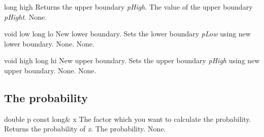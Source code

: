 \setConstInstance
\printEmptyMethodReturnSpecial
{long}
{high}
{Returns the upper boundary {\em pHigh}.}
{The value of the upper boundary {\em pHight}.}
{None.}

\setNormalInstance
\printMethodWithOneParam
{void}
{low}
{long}
{lo}
{New lower boundary.}
{Sets the lower boundary {\em pLow} using new lower boundary.}
{None.}
{None.}

\setNormalInstance
\printMethodWithOneParam
{void}
{high}
{long}
{hi}
{New upper boundary.}
{Sets the upper boundary {\em pHigh} using new upper boundary.}
{None.}
{None.}

\clearpage

\subsection{The probability}

\setConstInstance
\printMethodWithOneParam
{double}
{p}
{const long\&}
{x}
{The factor which you want to calculate the probability.}
{Returns the probability of {\em x}.}
{The probability.}
{None.}



